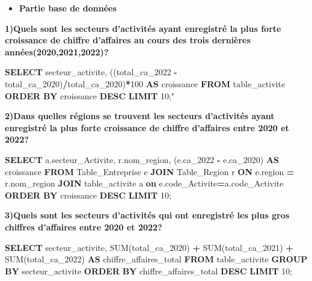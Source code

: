 \documentclass[mstat,12pt]{unswthesis}
\newenvironment{Shaded}{\begin{snugshade}}{\end{snugshade}}
\newcommand{\DecValTok}[1]{\textcolor[rgb]{0.00,0.00,0.81}{#1}}
\newcommand{\FunctionTok}[1]{\textcolor[rgb]{0.00,0.00,0.00}{#1}}
\newcommand{\KeywordTok}[1]{\textcolor[rgb]{0.13,0.29,0.53}{\textbf{#1}}}
\newcommand{\NormalTok}[1]{#1}
\newcommand{\OperatorTok}[1]{\textcolor[rgb]{0.81,0.36,0.00}{\textbf{#1}}}
\newcommand{\OtherTok}[1]{\textcolor[rgb]{0.56,0.35,0.01}{#1}}
\begin{document}
\begin{itemize}
\tightlist
\item
  \textbf{Partie base de données}
\end{itemize}

\textbf{1)Quels sont les secteurs d'activités ayant enregistré la plus
forte croissance de chiffre d'affaires au cours des trois dernières
années(2020,2021,2022)?}

\bigskip

\begin{Shaded}
\begin{Highlighting}[]
\KeywordTok{SELECT}\NormalTok{ secteur\_activite,}
\NormalTok{((total\_ca\_2022 }\OperatorTok{{-}}\NormalTok{ total\_ca\_2020)}\OperatorTok{/}\NormalTok{total\_ca\_2020)}\OperatorTok{*}\DecValTok{100} \KeywordTok{AS}\NormalTok{ croissance}
\KeywordTok{FROM}\NormalTok{ table\_activite}
\KeywordTok{ORDER} \KeywordTok{BY}\NormalTok{ croissance }\KeywordTok{DESC}
\KeywordTok{LIMIT} \DecValTok{10}\NormalTok{;}\OtherTok{"}
\end{Highlighting}
\end{Shaded}

\textbf{2)Dans quelles régions se trouvent les secteurs d'activités
ayant enregistré la plus forte croissance de chiffre d'affaires entre
2020 et 2022?} \medskip

\begin{Shaded}
\begin{Highlighting}[]
\KeywordTok{SELECT}\NormalTok{ a.secteur\_Activite, r.nom\_region, }
\NormalTok{       (e.ca\_2022 }\OperatorTok{{-}}\NormalTok{ e.ca\_2020) }\KeywordTok{AS}\NormalTok{ croissance}
\KeywordTok{FROM}\NormalTok{ Table\_Entreprise e}
\KeywordTok{JOIN}\NormalTok{ Table\_Region r }\KeywordTok{ON}\NormalTok{ e.region }\OperatorTok{=}\NormalTok{ r.nom\_region}
\KeywordTok{JOIN}\NormalTok{ table\_activite a }\KeywordTok{on}\NormalTok{ e.code\_Activite}\OperatorTok{=}\NormalTok{a.code\_Activite}
\KeywordTok{ORDER} \KeywordTok{BY}\NormalTok{ croissance }\KeywordTok{DESC}
\KeywordTok{LIMIT} \DecValTok{10}\NormalTok{;}
\end{Highlighting}
\end{Shaded}

\medskip

\textbf{3)Quels sont les secteurs d'activités qui ont enregistré les
plus gros chiffres d'affaires entre 2020 et 2022?}

\begin{Shaded}
\begin{Highlighting}[]
\KeywordTok{SELECT}\NormalTok{ secteur\_activite, }\FunctionTok{SUM}\NormalTok{(total\_ca\_2020) }\OperatorTok{+} \FunctionTok{SUM}\NormalTok{(total\_ca\_2021) }\OperatorTok{+} \FunctionTok{SUM}\NormalTok{(total\_ca\_2022) }\KeywordTok{AS}\NormalTok{ chiffre\_affaires\_total}
\KeywordTok{FROM}\NormalTok{ table\_activite}
\KeywordTok{GROUP} \KeywordTok{BY}\NormalTok{ secteur\_activite}
\KeywordTok{ORDER} \KeywordTok{BY}\NormalTok{ chiffre\_affaires\_total }\KeywordTok{DESC}
\KeywordTok{LIMIT} \DecValTok{10}\NormalTok{;}
\end{Highlighting}
\end{Shaded}
\end{document}
